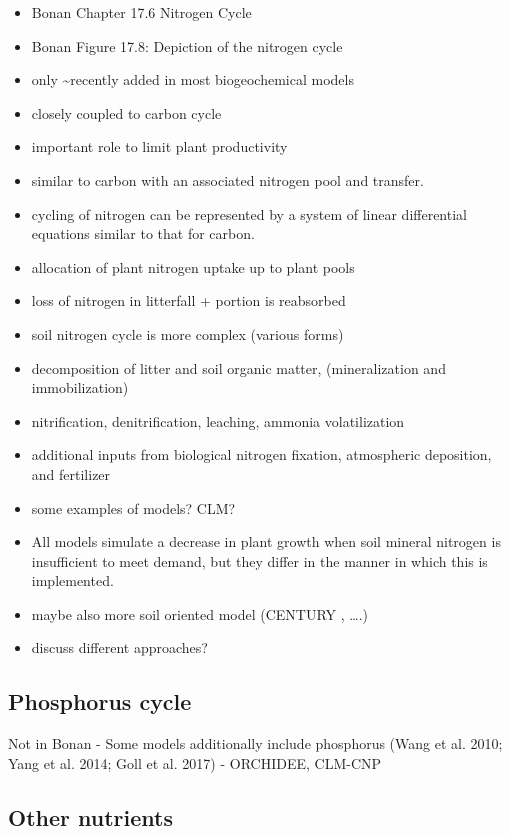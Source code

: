 \documentclass[12pt,oneside]{book}
\begin{document}
\begin{itemize}
\item
  Bonan Chapter 17.6 Nitrogen Cycle
\item
  Bonan Figure 17.8: Depiction of the nitrogen cycle
\item
  only \textasciitilde{}recently added in most biogeochemical models
\item
  closely coupled to carbon cycle
\item
  important role to limit plant productivity
\item
  similar to carbon with an associated nitrogen pool and transfer.
\item
  cycling of nitrogen can be represented by a system of linear
  differential equations similar to that for carbon.
\item
  allocation of plant nitrogen uptake up to plant pools
\item
  loss of nitrogen in litterfall + portion is reabsorbed
\item
  soil nitrogen cycle is more complex (various forms)
\item
  decomposition of litter and soil organic matter, (mineralization and
  immobilization)
\item
  nitrification, denitrification, leaching, ammonia volatilization
\item
  additional inputs from biological nitrogen fixation, atmospheric
  deposition, and fertilizer
\item
  some examples of models? CLM?
\item
  All models simulate a decrease in plant growth when soil mineral
  nitrogen is insufficient to meet demand, but they differ in the manner
  in which this is implemented.
\item
  maybe also more soil oriented model (CENTURY , \ldots{}.)
\item
  discuss different approaches?
\end{itemize}

\subsection{Phosphorus cycle}\label{phosphorus-cycle}

Not in Bonan - Some models additionally include phosphorus (Wang et al.
2010; Yang et al. 2014; Goll et al. 2017) - ORCHIDEE, CLM-CNP

\subsection{Other nutrients}\label{other-nutrients}
\end{document}
